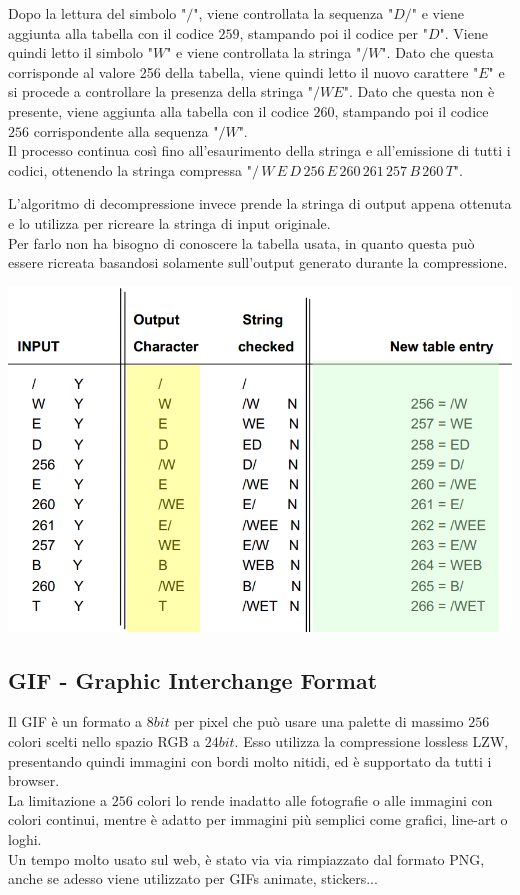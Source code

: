 \documentclass[a4paper,11pt]{article} %
\begin{document}
Dopo la lettura del simbolo "$/$", viene controllata la sequenza "$D/$" e viene aggiunta alla tabella con il codice $259$, stampando poi il codice per "$D$".
Viene quindi letto il simbolo "$W$" e viene controllata la stringa "$/W$". Dato che questa corrisponde al valore 256 della tabella, viene quindi letto il nuovo carattere "$E$" e si procede a controllare la presenza della stringa "$/WE$". Dato che questa non è presente, viene aggiunta alla tabella con il codice $260$, stampando poi il codice $256$ corrispondente alla sequenza "$/W$".\\
Il processo continua così fino all'esaurimento della stringa e all'emissione di tutti i codici, ottenendo la stringa compressa "$/\,W\,E\,D\,256\,E\,260\,261\,257\,B\,260\,T$". \\
\begin{minipage}{0.45\textwidth}
L'algoritmo di decompressione invece prende la stringa di output appena ottenuta e lo utilizza per ricreare la stringa di input originale. \\Per farlo non ha bisogno di conoscere la tabella usata, in quanto questa può essere ricreata basandosi solamente sull'output generato durante la compressione.
\end{minipage}
\begin{minipage}{0.55\textwidth}
\centering
    \includegraphics[width=\linewidth]{LZW example 2.png}
\end{minipage}

\subsection{GIF - Graphic Interchange Format}
Il GIF è un formato a $8bit$ per pixel che può usare una palette di massimo $256$ colori scelti nello spazio RGB a $24bit$. Esso utilizza la compressione lossless LZW, presentando quindi immagini con bordi molto nitidi, ed è supportato da tutti i browser.\\
La limitazione a $256$ colori lo rende inadatto alle fotografie o alle immagini con colori continui, mentre è adatto per immagini più semplici come grafici, line-art o loghi.\\
Un tempo molto usato sul web, è stato via via rimpiazzato dal formato PNG, anche se adesso viene utilizzato per GIFs animate, stickers...
\end{document}
